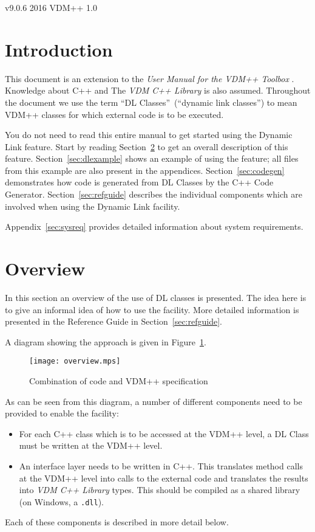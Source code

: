\documentclass[\pformat,12pt]{article}
\newcommand{\vdmcpplib}{\textit{VDM C++ Library}}
\begin{document}
       {v9.0.6}
       {2016}
       {VDM++}
       {1.0}


\section{Introduction}

This document is an extension to the {\it User Manual for the
 VDM++ Toolbox} \cite{UserManPP-CSK}. Knowledge
about C++ \cite{Stroustrup91} and The {\vdmcpplib}
\cite{LibMan-CSK} is also assumed. Throughout the document we use the term
``DL Classes''~(``dynamic link classes'') to mean VDM++ classes for
which external code is to be executed. 

You do not need to read this entire manual to get started using the
Dynamic Link feature. Start by reading Section~\ref{sec:overview}
to get an overall description of this
feature. Section~\ref{sec:dlexample} shows an example of using the
feature; all files from this example are also present in the
appendices. Section~\ref{sec:codegen} demonstrates how code is
generated from DL Classes by the C++ Code Generator.
Section~\ref{sec:refguide} describes the individual components which are
involved when using the Dynamic Link facility. 

Appendix~\ref{sec:sysreq} provides detailed information about system
requirements.




\section{Overview}\label{sec:overview}

In this section an overview of the use of DL classes is presented. The
idea here is to give an informal idea of how to use the facility. More
detailed information is presented in the Reference Guide in
Section~\ref{sec:refguide}. 

A diagram showing the approach is given in Figure~\ref{idea}. 
\begin{figure}
\begin{center}
\texttt{[image: overview.mps]}
\caption{Combination of code and VDM++ specification\label{idea}}
\end{center}
\end{figure}
As can be seen from this diagram, a number of different components
need to be provided to enable the facility:
\begin{itemize}
\item For each C++ class which is to be accessed at the VDM++ level, a
DL Class must be written at the VDM++ level.
\item An interface layer needs to be written in C++. This translates
method calls at the VDM++ level into calls to the external code and
translates the results into {\vdmcpplib} types. This should be compiled as a
shared library (on Windows, a \texttt{.dll}).
\end{itemize}
Each of these components is described in more detail below.
\end{document}
